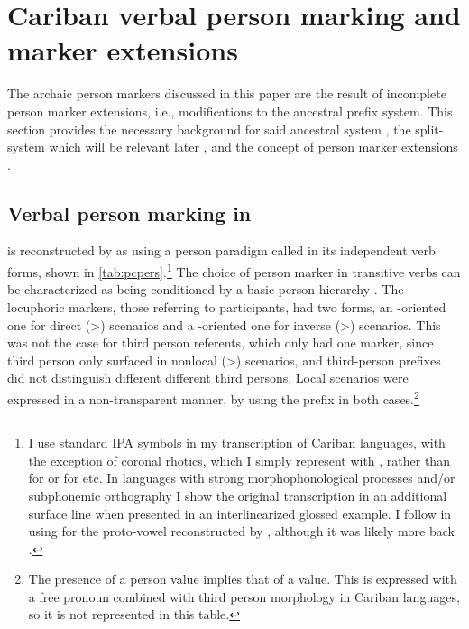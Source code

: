 \section{Cariban verbal person marking and marker extensions}
The archaic person markers discussed in this paper are the result of incomplete person marker extensions, i.e., modifications to the ancestral prefix system.
This section provides the necessary background for said ancestral system , the split- system which will be relevant later , and the concept of person marker extensions .

\subsection{Verbal person marking in \PC}
\label{sec:pc_person}
\PC is reconstructed by \textcite{gildea1998} as using a person paradigm called \setone in its independent verb forms, shown in \cref{tab:pcpers}.\footnote{I use standard IPA symbols in my transcription of Cariban languages, with the exception of coronal rhotics, which I simply represent with , rather than  for \wayana or  for \maqui etc. In languages with strong morphophonological processes and/or subphonemic orthography I show the original transcription in an additional surface line when presented in an interlinearized glossed example. I follow \textcite{gildea2018reconstructing} in using  for the proto-vowel reconstructed by \textcite{meira2005southern}, although it was likely more back \parencite{gildea2010story}.}
The choice of person marker in transitive verbs can be characterized as being conditioned by a basic person hierarchy .
The locuphoric markers, those referring to  participants, had two forms, an -oriented one for direct (>) scenarios and a -oriented one for inverse (>) scenarios.
This was not the case for third person referents, which only had one marker, since third person only surfaced in nonlocal (>) scenarios, and third-person prefixes did not distinguish different different third persons.
Local scenarios were expressed in a non-transparent manner, by using the  prefix  in both cases.\footnote{The presence of a  person value implies that of a  value. This is expressed with a free pronoun combined with third person morphology in Cariban languages, so it is not represented in this table.}

